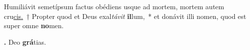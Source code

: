 
Humiliávit semetípsum factus obédiens usque ad mortem, mortem autem cru\underline{cis.}~† Propter quod et Deus exal\textit{távit} \textbf{il}lum,~* et donávit illi nomen, quod est super omne \textbf{no}men.

\textbf{\Rbar.} Deo \textbf{grá}tias.

